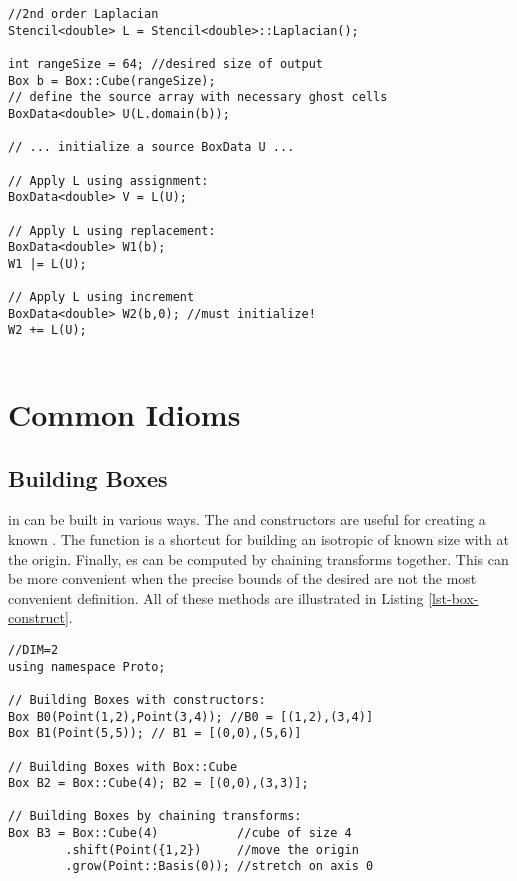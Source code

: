 \documentclass[12pt]{article}
\begin{document}
\begin{lstlisting}[caption=Stencil Application, label=lst-stencil-apply]
 //2nd order Laplacian
Stencil<double> L = Stencil<double>::Laplacian();

int rangeSize = 64; //desired size of output
Box b = Box::Cube(rangeSize);
// define the source array with necessary ghost cells
BoxData<double> U(L.domain(b));

// ... initialize a source BoxData U ... 

// Apply L using assignment:
BoxData<double> V = L(U);

// Apply L using replacement:
BoxData<double> W1(b);
W1 |= L(U);

// Apply L using increment
BoxData<double> W2(b,0); //must initialize!
W2 += L(U);
 
\end{lstlisting}

\section{Common Idioms}

\subsection{Building Boxes}

 in \libname can be built in various ways. The  and  constructors are useful for creating a known . The  function is a shortcut for building an isotropic  of known size with  at the origin. Finally, es can be computed by chaining transforms together. This can be more convenient when the precise bounds of the desired  are not the most convenient definition. All of these methods are illustrated in Listing \ref{lst-box-construct}.

\begin{lstlisting}[caption=Box Construction Idiom, label=lst-box-construct]
//DIM=2
using namespace Proto;

// Building Boxes with constructors:
Box B0(Point(1,2),Point(3,4)); //B0 = [(1,2),(3,4)]
Box B1(Point(5,5)); // B1 = [(0,0),(5,6)]

// Building Boxes with Box::Cube
Box B2 = Box::Cube(4); B2 = [(0,0),(3,3)];

// Building Boxes by chaining transforms:
Box B3 = Box::Cube(4)			//cube of size 4
		.shift(Point({1,2})     //move the origin
		.grow(Point::Basis(0));	//stretch on axis 0

\end{lstlisting}
\end{document}
